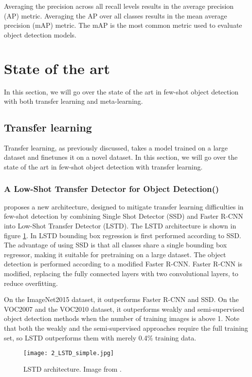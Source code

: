 Averaging the precision across all recall levels results in the average precision (AP) metric. Averaging the AP over all classes results in the mean average precision (mAP) metric. The mAP is the most common metric used to evaluate object detection models.

\section{State of the art}
In this section, we will go over the state of the art in few-shot object detection with both transfer learning and meta-learning.
\subsection{Transfer learning}
Transfer learning, as previously discussed, takes a model trained on a large dataset and finetunes it on a novel dataset. In this section, we will go over the state of the art in few-shot object detection with transfer learning.

\subsubsection{A Low-Shot Transfer Detector for Object Detection(\citet{LSTD})}
\citet{LSTD} proposes a new architecture, designed to mitigate transfer learning difficulties in few-shot detection by combining Single Shot Detector (SSD) and Faster R-CNN into Low-Shot Transfer Detector (LSTD). The LSTD architecture is shown in figure \ref{fig:2_LSTD}. In LSTD bounding box regression is first performed according to SSD. The advantage of using SSD is that all classes share a single bounding box regressor, making it suitable for pretraining on a large dataset. The object detection is performed according to a modified Faster R-CNN. Faster R-CNN is modified, replacing the fully connected layers with two convolutional layers, to reduce overfitting.

On the ImageNet2015 dataset, it outperforms Faster R-CNN and SSD. On the VOC2007 and the VOC2010 dataset, it outperforms weakly and semi-supervised object detection methods when the number of training images is above 1. Note that both the weakly and the semi-supervised approaches require the full training set, so LSTD outperforms them with merely 0.4\% training data.

\begin{figure}[h]
	\centering
	\texttt{[image: 2\_LSTD\_simple.jpg]}
	\caption{\label{fig:2_LSTD} LSTD architecture. Image from \citet{LSTD}.}
\end{figure}

